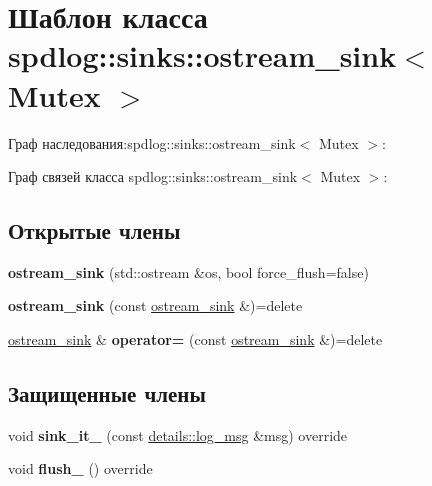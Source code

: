 \hypertarget{classspdlog_1_1sinks_1_1ostream__sink}{}\section{Шаблон класса spdlog\+:\+:sinks\+:\+:ostream\+\_\+sink$<$ Mutex $>$}
\label{classspdlog_1_1sinks_1_1ostream__sink}


Граф наследования\+:spdlog\+:\+:sinks\+:\+:ostream\+\_\+sink$<$ Mutex $>$\+:


Граф связей класса spdlog\+:\+:sinks\+:\+:ostream\+\_\+sink$<$ Mutex $>$\+:
\subsection*{Открытые члены}
\begin{DoxyCompactItemize}
\item 
\mbox{\label{classspdlog_1_1sinks_1_1ostream__sink_aa038c6518dc69c08a1251e7469bc4fd8}} 
{\bfseries ostream\+\_\+sink} (std\+::ostream \&os, bool force\+\_\+flush=false)
\item 
\mbox{\label{classspdlog_1_1sinks_1_1ostream__sink_a761f1c26210fe42673af4734b38fe167}} 
{\bfseries ostream\+\_\+sink} (const \hyperlink{classspdlog_1_1sinks_1_1ostream__sink}{ostream\+\_\+sink} \&)=delete
\item 
\mbox{\label{classspdlog_1_1sinks_1_1ostream__sink_a727591b2a4ca044848cacccfca4eb3af}} 
\hyperlink{classspdlog_1_1sinks_1_1ostream__sink}{ostream\+\_\+sink} \& {\bfseries operator=} (const \hyperlink{classspdlog_1_1sinks_1_1ostream__sink}{ostream\+\_\+sink} \&)=delete
\end{DoxyCompactItemize}
\subsection*{Защищенные члены}
\begin{DoxyCompactItemize}
\item 
\mbox{\label{classspdlog_1_1sinks_1_1ostream__sink_a77f36cef81daf668ec55a07fa191d1e7}} 
void {\bfseries sink\+\_\+it\+\_\+} (const \hyperlink{structspdlog_1_1details_1_1log__msg}{details\+::log\+\_\+msg} \&msg) override
\item 
\mbox{\label{classspdlog_1_1sinks_1_1ostream__sink_a96458aa6b79019744ef4cb61979c39e0}} 
void {\bfseries flush\+\_\+} () override
\end{DoxyCompactItemize}
